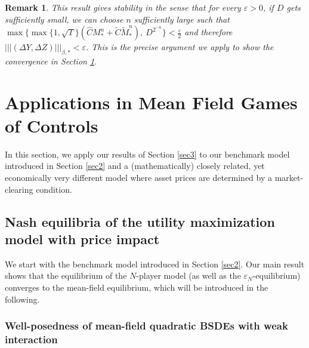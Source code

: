 \documentclass[10pt,a4paper]{article}
\newcommand{\vep}{{\varepsilon}}
\theoremstyle{plain}
\newtheorem{Remark}[Theorem]{Remark}
\theoremstyle{definition}
\numberwithin{equation}{section}
\newcommand{\trinm}[1]{\vert\!\vert\!\vert #1 \vert\!\vert\!\vert}
\begin{document}
\begin{Remark}
This result gives stability in the sense that for every $\varepsilon > 0$, if $D$ gets sufficiently small, we can choose $n$ sufficiently large such that $\max\bigl\{\max\{1,\sqrt{T}\}(\hat{C}M_{*}^{n}+\tilde{C}\tilde{M}_{*}^{n}) , \ D^{2^{-n}}\bigr\} < \tfrac{\varepsilon}{2}$ and therefore $\trinm{(\Delta Y,\Delta Z)}_{\beta,*} < \varepsilon$. This is the precise argument we apply to show the convergence in Section \ref{sec4}. 
\end{Remark}






\section{Applications in Mean Field Games of Controls}
\label{sec4}

In this section, we apply our results of Section \ref{sec3} to our benchmark model introduced in Section \ref{sec2} and a (mathematically) closely related, yet economically very different model where asset prices are determined by a market-clearing condition. 

\subsection{Nash equilibria of the utility maximization model with price impact}
\label{sec4.1}

We start with the benchmark model introduced in Section \ref{sec2}. Our main result shows that the equilibrium of the $N$-player model (as well as the $\vep_N$-equilibrium) converges to the mean-field equilibrium, which will be introduced in the following. 

\subsubsection{Well-posedness of mean-field quadratic BSDEs with weak interaction}
\label{sec4.1.1}
\end{document}
